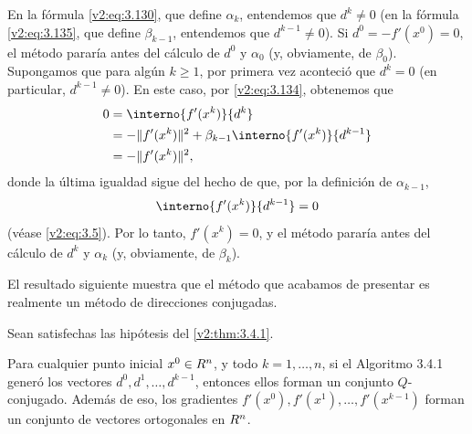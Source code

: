En la fórmula \eqref{v2:eq:3.130}, que define $\alpha_k$, entendemos que $d^k \neq 0$ (en la fórmula \eqref{v2:eq:3.135}, que define $\beta_{k-1}$, entendemos que $d^{k-1} \neq 0$). Si $d^0 = -f'(x^0) = 0$, el método pararía antes del cálculo de $d^0$ y $\alpha_0$ (y, obviamente, de $\beta_0$). Supongamos que para algún $k \ge 1$, por primera vez aconteció que $d^k = 0$ (en particular, $d^{k-1} \neq 0$). En este caso, por \eqref{v2:eq:3.134}, obtenemos que
\begin{align*}
    0 &= \interno{f'(x^k)}{d^k} \\
    &= -\|f'(x^k)\|^2 + \beta_{k-1}\interno{f'(x^k)}{d^{k-1}} \\
    &= -\|f'(x^k)\|^2,
\end{align*}
donde la última igualdad sigue del hecho de que, por la definición de $\alpha_{k-1}$,
\begin{equation}
    \interno{f'(x^k)}{d^{k-1}} = 0
    \label{v2:eq:3.136}
\end{equation}
(véase \eqref{v2:eq:3.5}). Por lo tanto, $f'(x^k) = 0$, y el método pararía antes del cálculo de $d^k$ y $\alpha_k$ (y, obviamente, de $\beta_k$).

El resultado siguiente muestra que el método que acabamos de presentar es realmente un método de direcciones conjugadas.

\begin{theorem}\label{v2:thm:3.4.3}
    Sean satisfechas las hipótesis del \cref{v2:thm:3.4.1}.
    
    Para cualquier punto inicial $x^0 \in R^n$, y todo $k = 1, \dots, n$, si el Algoritmo 3.4.1 generó los vectores $d^0, d^1, \dots, d^{k-1}$, entonces ellos forman un conjunto $Q$-conjugado. Además de eso, los gradientes $f'(x^0), f'(x^1), \dots, f'(x^{k-1})$ forman un conjunto de vectores ortogonales en $R^n$.
\end{theorem}

